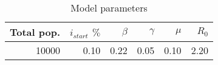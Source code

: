 \begin{table}[h]
\centering
\caption{Model parameters}
\label{tab:params}
\begin{tabular}{rrrrrr}
\toprule
Total pop. & $i_{start}$ $\%$ & $\beta$ & $\gamma$ & $\mu$ & $R_{0}$ \\
\midrule
         10000 &             0.10 &   0.22 &     0.05 &  0.10 &    2.20 \\
\bottomrule
\end{tabular}
\end{table}
